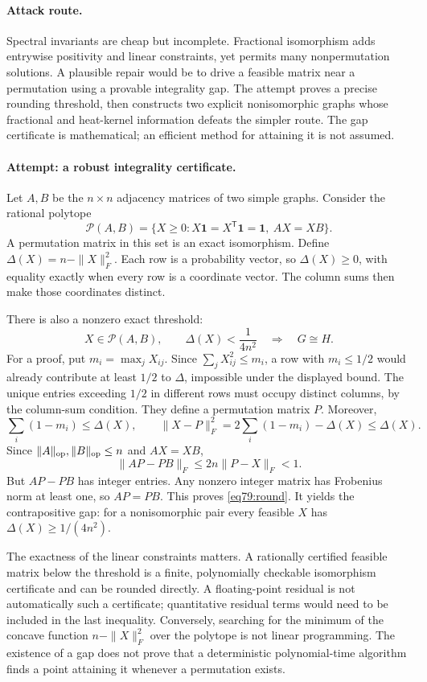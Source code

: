 \documentclass[11pt,a4paper]{article}
\numberwithin{equation}{section}
\begin{document}
\paragraph{Attack route.}
Spectral invariants are cheap but incomplete. Fractional isomorphism adds
entrywise positivity and linear constraints, yet permits many nonpermutation
solutions. A plausible repair would be to drive a feasible matrix near a
permutation using a provable integrality gap. The attempt proves a precise
rounding threshold, then constructs two explicit nonisomorphic graphs whose
fractional and heat-kernel information defeats the simpler route. The gap
certificate is mathematical; an efficient method for attaining it is not
assumed.

\paragraph{Attempt: a robust integrality certificate.}
Let $A,B$ be the $n\times n$ adjacency matrices of two simple graphs.
Consider the rational polytope
\[
 \mathcal P(A,B)=\{X\geq0:X\mathbf1=X^{\mathsf T}\mathbf1=\mathbf1,
                                     \ AX=XB\}.
\]
A permutation matrix in this set is an exact isomorphism. Define
$\Delta(X)=n-\|X\|_F^2$. Each row is a probability vector, so
$\Delta(X)\geq0$, with equality exactly when every row is a coordinate
vector. The column sums then make those coordinates distinct.

There is also a nonzero exact threshold:
\begin{equation}\label{eq79:round}
 X\in\mathcal P(A,B),\qquad \Delta(X)<\frac1{4n^2}
 \quad\Longrightarrow\quad G\cong H.
\end{equation}
For a proof, put $m_i=\max_jX_{ij}$. Since
$\sum_jX_{ij}^2\leq m_i$, a row with $m_i\leq1/2$ would already
contribute at least $1/2$ to $\Delta$, impossible under the displayed
bound. The unique entries exceeding $1/2$ in different rows must occupy
distinct columns, by the column-sum condition. They define a permutation
matrix $P$. Moreover,
\[
 \sum_i(1-m_i)\leq\Delta(X),\qquad
 \|X-P\|_F^2=2\sum_i(1-m_i)-\Delta(X)\leq\Delta(X).
\]
Since $\|A\|_{\rm op},\|B\|_{\rm op}\leq n$ and $AX=XB$,
\[
 \|AP-PB\|_F\leq2n\|P-X\|_F<1.
\]
But $AP-PB$ has integer entries. Any nonzero integer matrix has Frobenius
norm at least one, so $AP=PB$. This proves \eqref{eq79:round}.
It yields the contrapositive gap: for a nonisomorphic pair every feasible
$X$ has $\Delta(X)\geq1/(4n^2)$.

The exactness of the linear constraints matters. A rationally certified
feasible matrix below the threshold is a finite, polynomially checkable
isomorphism certificate and can be rounded directly. A floating-point
residual is not automatically such a certificate; quantitative residual
terms would need to be included in the last inequality. Conversely,
searching for the minimum of the concave function $n-\|X\|_F^2$ over the
polytope is not linear programming. The existence of a gap does not prove
that a deterministic polynomial-time algorithm finds a point attaining
it whenever a permutation exists.
\end{document}

